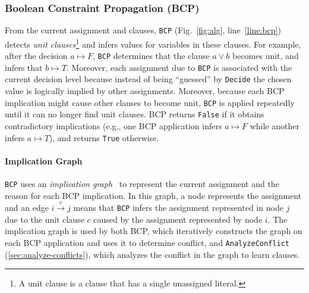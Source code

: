 \documentclass[oneside,11pt,dvipsnames]{book}
\numberwithin{equation}{section}
\theoremstyle{definition}
\theoremstyle{remark}
\newcommand{\tool}{\texttt{NeuralSAT}}
\begin{document}





\subsubsection{Boolean Constraint Propagation (BCP)}\label{sec:bcp}

From the current assignment and clauses, \texttt{BCP} (Fig.~\ref{fig:alg}, line~\ref{line:bcp}) detects \emph{unit clauses}\footnote{A unit clause is a clause that has a single unassigned literal.} and infers values for variables in these clauses.
For example, after the decision $a\mapsto F$, \texttt{BCP} determines that the clause $a\vee b$ becomes unit, and infers that $b \mapsto T$.
Moreover, each assignment due to \texttt{BCP} is associated with the current decision level because instead of being ``guessed'' by \texttt{Decide} the chosen value is logically implied by other assignments.
Moreover, because each {BCP} implication might cause other clauses to become unit, \texttt{BCP} is applied repeatedly until it can no longer find unit clauses.
\textsc{BCP} returns \texttt{False} if it obtains contradictory implications (e.g., one BCP application infers $a \mapsto F$ while another infers $a \mapsto T$), and returns \texttt{True} otherwise.

\paragraph{Implication Graph} \texttt{BCP} uses an \emph{implication graph}~\cite{barrett2013decision} to represent the current assignment and the reason for each BCP implication. In this graph, a node represents the assignment and an edge $i \xrightarrow{c} j$ means that \texttt{BCP} infers the assignment represented in node $j$ due to the unit clause $c$ caused by the assignment represented by node $i$.
The implication graph is used by both BCP, which iteratively constructs the graph on each BCP application and uses it to determine conflict, and \texttt{AnalyzeConflict} (\autoref{sec:analyze-conflicts}), which analyzes the conflict in the graph to learn clauses.
\end{document}
